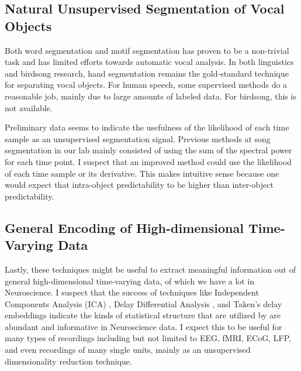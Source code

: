 \subsection{Natural Unsupervised Segmentation of Vocal Objects}
Both word segmentation and motif segmentation has proven to be a non-trivial task and has limited efforts towards automatic vocal analysis. In both linguistics and birdsong research, hand segmentation remains the gold-standard technique for separating vocal objects. For human speech, some supervised methods do a reasonable job, mainly due to large amounts of labeled data. For birdsong, this is not available.

Preliminary data seems to indicate the usefulness of the likelihood of each time sample as an unsupervised segmentation signal. Previous methods at song segmentation in our lab mainly consisted of using the sum of the spectral power for each time point. I suspect that an improved method could use the likelihood of each time sample or its derivative. This makes intuitive sense because one would expect that intra-object predictability to be higher than inter-object predictability.

\subsection{General Encoding of High-dimensional Time-Varying Data}
Lastly, these techniques might be useful to extract meaningful information out of general high-dimensional time-varying data, of which we have a lot in Neuroscience. I suspect that the success of techniques like Independent Components Analysis (ICA) \cite{ICA}, Delay Differential Analysis \cite{DDA}, and Taken's delay embeddings indicate the kinds of statistical structure that are utilized by \CPC are abundant and informative in Neuroscience data. I expect this to be useful for many types of recordings including but not limited to EEG, fMRI, ECoG, LFP, and even recordings of many single units, mainly as an unsupervised dimensionality reduction technique.